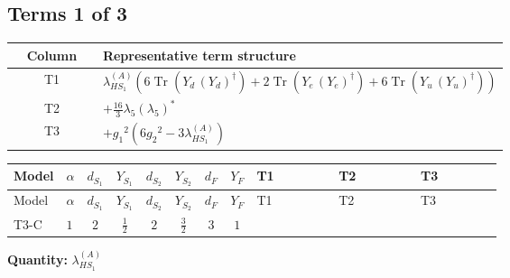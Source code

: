 \documentclass[8pt]{article}
\begin{document}
\begin{landscape}
\subsection*{Terms 1 of 3}
\begin{center}
\begin{tabular}{@{}c >{\raggedright\arraybackslash}p{0.82\linewidth}@{}}
\toprule
Column & Representative term structure \\
\midrule
T1 & \(\displaystyle {\lambda_{HS_1}^{(A)}} (6 \operatorname{Tr}\!\left({Y_d}\,\left({Y_d}\right)^{\dagger}\right)+2 \operatorname{Tr}\!\left({Y_e}\,\left({Y_e}\right)^{\dagger}\right)+6 \operatorname{Tr}\!\left({Y_u}\,\left({Y_u}\right)^{\dagger}\right))\) \\
\midrule
T2 & \(\displaystyle +\frac{16}{3} {\lambda_5} \left({\lambda_5}\right)^{*}\) \\
\midrule
T3 & \(\displaystyle +{g_1}^2 \left(6 {g_2}^2-3 {\lambda_{HS_1}^{(A)}}\right)\) \\
\midrule
\bottomrule
\end{tabular}
\end{center}
\smallskip
\tiny
\begin{longtable}{@{}llcccccc >{\raggedright\arraybackslash}p{0.21\linewidth} >{\raggedright\arraybackslash}p{0.21\linewidth} >{\raggedright\arraybackslash}p{0.21\linewidth}@{}}
\toprule
Model & $\alpha$ & $d_{S_1}$ & $Y_{S_1}$ & $d_{S_2}$ & $Y_{S_2}$ & $d_F$ & $Y_F$ & T1 & T2 & T3 \\
\midrule
\endfirsthead
\toprule
Model & $\alpha$ & $d_{S_1}$ & $Y_{S_1}$ & $d_{S_2}$ & $Y_{S_2}$ & $d_F$ & $Y_F$ & T1 & T2 & T3 \\
\midrule
\endhead
T3-C & $1$ & $2$ & $\frac{1}{2}$ & $2$ & $\frac{3}{2}$ & $3$ & $1$ & \scriptsize\adjustbox{max width=\linewidth}{$\begin{gathered} {\lambda_{HS_1}^{(A)}} (6 \operatorname{Tr}\!\left({Y_d}\,\left({Y_d}\right)^{\dagger}\right)+2 \operatorname{Tr}\!\left({Y_e}\,\left({Y_e}\right)^{\dagger}\right)+6 \operatorname{Tr}\!\left({Y_u}\,\left({Y_u}\right)^{\dagger}\right))\end{gathered}$} & \scriptsize\adjustbox{max width=\linewidth}{$\begin{gathered} +\frac{16}{3} {\lambda_5} \left({\lambda_5}\right)^{*}\end{gathered}$} & \scriptsize\adjustbox{max width=\linewidth}{$\begin{gathered} +{g_1}^2 \left(6 {g_2}^2-3 {\lambda_{HS_1}^{(A)}}\right)\end{gathered}$} \\
\midrule
\bottomrule
\end{longtable}
\clearpage
\noindent\textbf{Quantity: }$\lambda_{HS_1}^{(A)}$\par\smallskip

\end{landscape}
\end{document}
